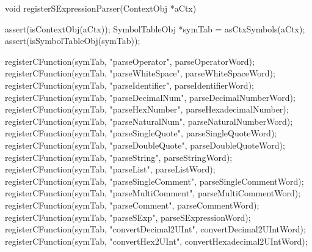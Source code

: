 \startCCode
void registerSExpressionParser(ContextObj *aCtx) {
  assert(isContextObj(aCtx));
  SymbolTableObj *symTab = asCtxSymbols(aCtx);
  assert(isSymbolTableObj(symTab));
  
  registerCFunction(symTab, "parseOperator",       parseOperatorWord);
  registerCFunction(symTab, "parseWhiteSpace",     parseWhiteSpaceWord);
  registerCFunction(symTab, "parseIdentifier",     parseIdentifierWord);
  registerCFunction(symTab, "parseDecimalNum",     parseDecimalNumberWord);
  registerCFunction(symTab, "parseHexNumber",      parseHexadecimalNumber);
  registerCFunction(symTab, "parseNaturalNum",     parseNaturalNumberWord);
  registerCFunction(symTab, "parseSingleQuote",    parseSingleQuoteWord);
  registerCFunction(symTab, "parseDoubleQuote",    parseDoubleQuoteWord);
  registerCFunction(symTab, "parseString",         parseStringWord);
  registerCFunction(symTab, "parseList",           parseListWord);
  registerCFunction(symTab, "parseSingleComment",  parseSingleCommentWord);
  registerCFunction(symTab, "parseMultiComment",   parseMultiCommentWord);
  registerCFunction(symTab, "parseComment",        parseCommentWord);
  registerCFunction(symTab, "parseSExp",           parseSExpressionWord);
  registerCFunction(symTab, "convertDecimal2UInt", convertDecimal2UIntWord);
  registerCFunction(symTab, "convertHex2UInt",     convertHexadecimal2UIntWord);
}
\stopCCode
